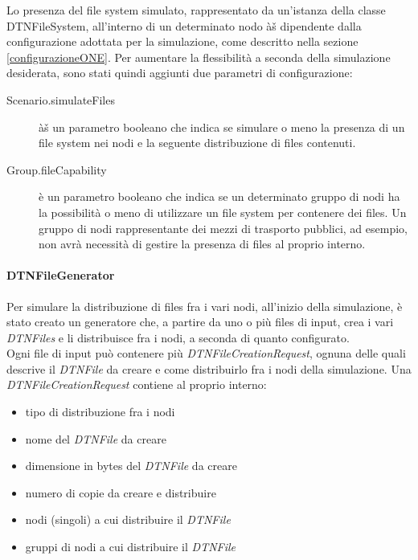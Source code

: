 Lo presenza del file system simulato, rappresentato da un'istanza della classe DTNFileSystem, all'interno di un determinato nodo àš dipendente dalla configurazione adottata per la simulazione, come descritto nella sezione \ref{configurazioneONE}. Per aumentare la flessibilità  a seconda della simulazione desiderata, sono stati quindi aggiunti due parametri di configurazione:
\begin{description}
\item[Scenario.simulateFiles] àš un parametro booleano che indica se simulare o meno la presenza di un file system nei nodi e la seguente distribuzione di files contenuti.
\item[Group.fileCapability] è un parametro booleano che indica se un determinato gruppo di nodi ha la possibilità  o meno di utilizzare un file system per contenere dei files. Un gruppo di nodi rappresentante dei mezzi di trasporto pubblici, ad esempio, non avrà  necessità  di gestire la presenza di files al proprio interno.
\end{description}

\paragraph{DTNFileGenerator}
Per simulare la distribuzione di files fra i vari nodi, all'inizio della simulazione, è stato creato un generatore che, a partire da uno o più files di input, crea i vari \textit{DTNFiles} e li distribuisce fra i nodi, a seconda di quanto configurato.
\\
Ogni file di input può contenere più \textit{DTNFileCreationRequest}, ognuna delle quali descrive il \textit{DTNFile} da creare e come distribuirlo fra i nodi della simulazione. Una \textit{DTNFileCreationRequest} contiene al proprio interno:
\begin{itemize}
\item tipo di distribuzione fra i nodi
\item nome del \textit{DTNFile} da creare
\item dimensione in bytes del \textit{DTNFile} da creare
\item numero di copie da creare e distribuire
\item nodi (singoli) a cui distribuire il \textit{DTNFile}
\item gruppi di nodi a cui distribuire il \textit{DTNFile}
\end{itemize}

